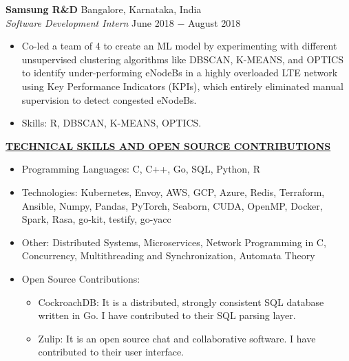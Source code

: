 \documentclass{article}
\begin{document}
\pagebreak

\noindent \textbf{Samsung R\&D} \hfill Bangalore, Karnataka, India \\
\textit{Software Development Intern} \hfill June 2018 $-$ August 2018
\begin{itemize}[noitemsep,nolistsep,leftmargin=*]
\item {Co-led a team of 4 to create an ML model by experimenting with different unsupervised clustering algorithms like DBSCAN, K-MEANS, and OPTICS to identify under-performing eNodeBs in a highly overloaded LTE network using Key Performance Indicators (KPIs), which entirely eliminated manual supervision to detect congested eNodeBs.}
\item{Skills: R, DBSCAN, K-MEANS, OPTICS.\\}
\end{itemize}

\noindent \textbf{\underline{TECHNICAL SKILLS AND OPEN SOURCE CONTRIBUTIONS}}
\begin{itemize}[noitemsep,nolistsep,leftmargin=*]
\item {Programming Languages: C, C++, Go, SQL, Python, R}
\item {Technologies:  Kubernetes, Envoy, AWS, GCP, Azure, Redis, Terraform, Ansible, Numpy, Pandas, PyTorch, Seaborn, CUDA, OpenMP, Docker, Spark, Rasa, go-kit, testify, go-yacc}
\item {Other: Distributed Systems, Microservices, Network Programming in C, Concurrency, Multithreading and Synchronization, Automata Theory}
\item {Open Source Contributions:}
\begin{itemize}
    \item CockroachDB: It is a distributed, strongly consistent SQL database written in Go. I have contributed to their SQL parsing layer. 
    \item Zulip: It is an open source chat and collaborative software. I have contributed to their user interface.
\end{itemize}
\end{itemize}

%
%


\end{document}
